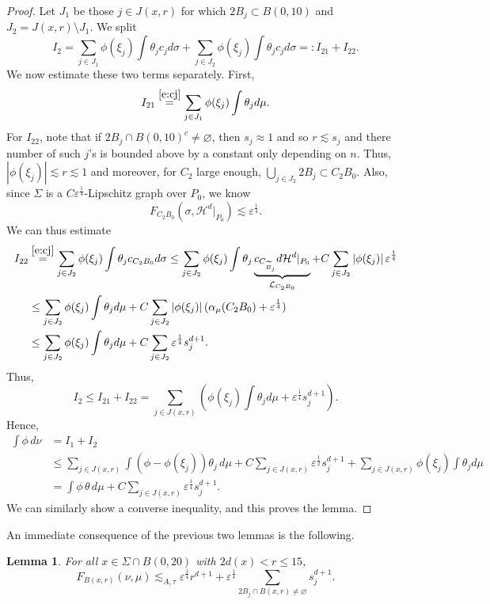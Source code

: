 \documentclass[11pt]{amsart}
\newcommand{\LL}{{\mathcal L}}
\newcommand{\ve}{{\varepsilon}}
\newcommand{\wt}[1]{{\widetilde{#1}}}
\newtheorem{lemma}[theorem]{Lemma}
\theoremstyle{definition}
\theoremstyle{remark}
\numberwithin{equation}{section}
\def\cH{{\mathcal{H}}}
\newcommand{\ps}[1]{\left( #1 \right)}
\def\lec{\lesssim}
\def\lec{\lesssim}
\begin{document}
\begin{proof}
Let $J_{1}$ be those $j\in J(x,r)$ for which $2B_{j}\subset B(0,10)$ and $J_{2}=J(x,r)\setminus J_{1}$. We split
\[
I_{2} = \sum_{j\in J_{1}}  \phi(\xi_{j}) \int  \theta_{j}c_{j}d\sigma 
+  \sum_{j\in J_{2}}  \phi(\xi_{j}) \int  \theta_{j}c_{j}d\sigma 
=:I_{21}+I_{22}.\]
We now estimate these two terms separately. First,
\[
I_{21}\stackrel{\eqref{e:cj}}{=}\sum_{j\in J_1} \phi(\xi_{j}) \int  \theta_{j}d\mu.
\]
For $I_{22}$, note that if $2B_{j}\cap B(0,10)^{c}\neq\varnothing$, then $s_{j}\approx 1$ and so $r\lec s_{j}$ and  there number of such $j$'s is bounded above by a constant only depending on $n$. Thus, $|\phi(\xi_j)|\lesssim r\lesssim1$ and moreover,
for $C_{2}$ large enough, $\bigcup_{j\in J_2} 2B_{j}\subset C_{2}B_{0}$. Also, since $\Sigma$ is a $C\ve^{\frac{1}{4}}$-Lipschitz graph over $P_{0}$, we know 
\[
F_{C_{2}B_{0}}(\sigma,\cH^{d}|_{P_{0}})\lec \ve^{\frac{1}{4}}.\] 
We can thus estimate
\begin{align*}
I_{22}
& \stackrel{\eqref{e:cj}}{=} \sum_{j\in J_{2}}  \phi(\xi_{j}) \int  \theta_{j}c_{C_{2}B_{0}}d\sigma 
\leq 
\sum_{j\in J_{2}}  \phi(\xi_{j}) \int  \theta_{j}\underbrace{c_{C_{\wt{B}_{j}}}d\cH^{d}|_{P_{0}}}_{\LL_{C_{2}B_{0}}} +C\sum_{j\in J_{2}}  |\phi(\xi_{j})| \, \ve^{\frac{1}{4}}\\
& \leq \sum_{j\in J_{2}}  \phi(\xi_{j}) \int  \theta_{j} d\mu +C\sum_{j\in J_{2}}  |\phi(\xi_{j})|\,(\alpha_{\mu}(C_{2}B_{0})+\ve^{\frac{1}{4}})\\
& \leq \sum_{j\in J_{2}}  \phi(\xi_{j}) \int  \theta_{j} d\mu +C\sum_{j\in J_2} \ve^{\frac{1}{4}} s_{j}^{d+1}.
\end{align*}
Thus,
\[
I_{2} \leq I_{21}+I_{22} = \sum_{j\in J(x,r)} \ps{ \phi(\xi_{j})\int \theta_{j}d\mu + \ve^{\frac{1}{4}} s_{j}^{d+1}}.\]
Hence,
\begin{align*}
\int \phi\, d\nu 
& =I_{1}+I_{2} \\
&\leq \sum_{j\in J(x,r)}\int (\phi-\phi(\xi_{j})) \theta_{j}\,d\mu + C \sum_{j\in J(x,r)}\ve^{\tfrac12} s_{j}^{d+1} + \sum_{j\in J(x,r)} \phi(\xi_{j}) \int  \theta_{j}d\mu\\
&=\int \phi \,\theta\, d\mu + C\sum_{j\in J(x,r)} \ve^{\frac{1}{4}} s_{j}^{d+1} .
\end{align*}
We can similarly show a converse inequality, and this proves the lemma. 
\end{proof}

An immediate consequence of the previous two lemmas is the following.

\begin{lemma}
	For all $x\in \Sigma\cap B(0,20)$ with $2d(x)<r\leq15$, 
	\begin{equation}
	\label{e:dnumu}
	F_{B(x,r)}(\nu,\mu)\lec_{A,\tau}  \ve^{\frac{1}{4}} r^{d+1} + \ve^{\frac14} \sum_{2B_{j}\cap B(x,r)\neq\varnothing}  s_{j}^{d+1}.
	\end{equation}
\end{lemma}
\end{document}

